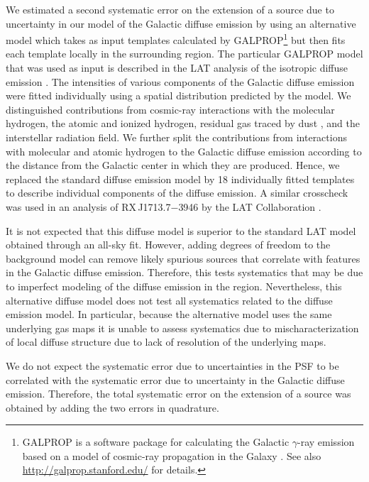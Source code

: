 \documentclass[12pt,preprint]{aastex}
\begin{document}
We estimated a second systematic error on the extension of a source
due to uncertainty in our model of the Galactic diffuse emission by
using an alternative model which takes as input templates
calculated by
GALPROP\footnote{GALPROP is a software package for calculating the
Galactic $\gamma$-ray emission based on a model of cosmic-ray propagation
in the Galaxy \citep{galprop1998,galprop2011}. 
See also \url{http://galprop.stanford.edu/} for details.} 
but then fits each template locally in
the surrounding region.
The particular GALPROP model that was used as input is described in
the LAT analysis of the isotropic diffuse
emission \citep{isotropic_lat}.  
The intensities of various components
of the Galactic diffuse emission were fitted individually using a
spatial distribution predicted by
the model.  We distinguished contributions from cosmic-ray interactions with the
molecular hydrogen, the atomic and ionized hydrogen, residual gas traced
by dust \citep{isabelle_dark_gass}, and the interstellar radiation
field. We further split the contributions from interactions with molecular
and atomic hydrogen to the Galactic diffuse emission according to the
distance from the Galactic center in which they are produced. Hence, we
replaced the standard diffuse emission model by 18 individually fitted
templates to describe individual components of the diffuse emission.
A similar crosscheck was used in an analysis of RX\,J1713.7$-$3946 
by the LAT Collaboration \citep{rx_j1713_lat}.

It is not expected that this diffuse model is superior to the standard
LAT model obtained through an all-sky fit.  However, adding degrees of
freedom to the background model can remove likely spurious sources that
correlate with features in the Galactic diffuse emission.  Therefore,
this tests systematics that may be due to imperfect modeling of the
diffuse emission in the region. Nevertheless, this alternative diffuse
model does not test all systematics related to the diffuse emission model.
In particular, because the alternative model uses the same underlying gas
maps it is unable to assess systematics due to mischaracterization of local
diffuse structure due to lack of resolution of the underlying maps.

We do not expect the systematic error due to uncertainties in the PSF
to be correlated with the systematic error due to uncertainty in the
Galactic diffuse emission. Therefore, the total systematic error on the
extension of a source was obtained by adding the two errors in quadrature.
\end{document}
